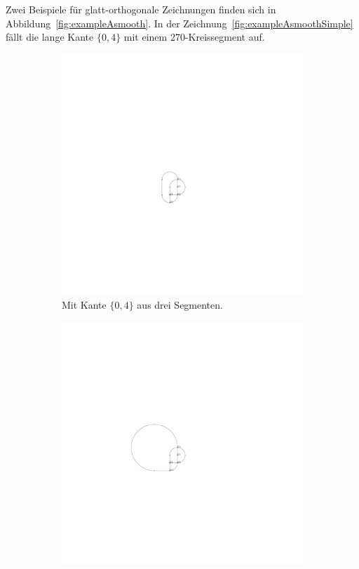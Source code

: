 \documentclass[a4paper]{scrreprt}
\theoremstyle{definition}
\begin{document}
Zwei Beispiele für glatt-orthogonale Zeichnungen finden sich in Abbildung~\ref{fig:exampleAsmooth}. In der Zeichnung~\ref{fig:exampleAsmoothSimple} fällt die lange Kante $\{0,4\}$ mit einem 270\textdegree-Kreissegment auf.

\begin{figure}[h]
  \centering
\begin{subfigure}[b]{0.3\textwidth}
  \centering
  \includegraphics{exampleA_smoothComplex}
  \caption{Mit Kante $\{0,4\}$ aus drei Segmenten.}
  \label{fig:exampleAsmoothComplex}
\end{subfigure}
  \quad
\begin{subfigure}[b]{0.6\textwidth}
  \centering
  \includegraphics{exampleA_smooth}

\end{subfigure}
\end{figure}
\end{document}
